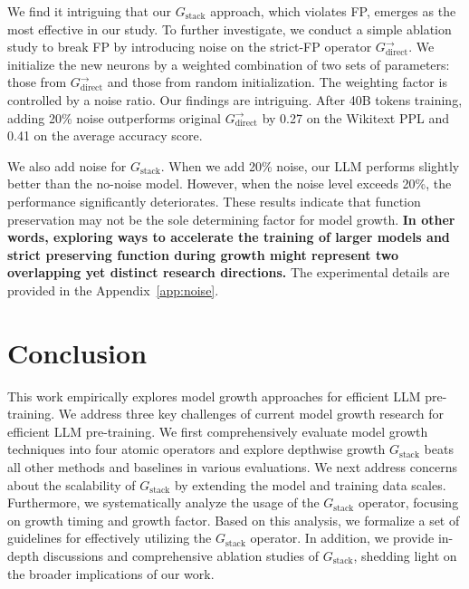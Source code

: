 \documentclass{article}
\begin{document}
We find it intriguing that our $G_{\text{stack}}$ approach, which violates FP, emerges as the most effective in our study.
To further investigate, we conduct a simple ablation study to break FP by introducing noise on the strict-FP operator $G_{\text{direct}}^{\to}$.
We initialize the new neurons by a weighted combination of two sets of parameters: those from $G_{\text{direct}}^{\to}$ and those from 
random initialization. The weighting factor is controlled by a noise ratio.
Our findings are intriguing. After 40B tokens training, adding 20\% noise outperforms original $G_{\text{direct}}^{\to}$ by 0.27 on the Wikitext PPL and 0.41 on the average accuracy score.

We also add noise for $G_{\text{stack}}$.
When we add 20\% noise, our LLM performs slightly better than the no-noise model.
However, when the noise level exceeds 20\%, the performance significantly deteriorates.
These results indicate that function preservation may not be the sole determining factor for model growth.
\textbf{In other words, exploring ways to accelerate the training of larger models and strict preserving function during growth might represent two overlapping yet distinct research directions.}
The experimental details are provided in the Appendix~\ref{app:noise}.


\section{Conclusion}\label{sec:conclusion}
This work empirically explores model growth approaches for efficient LLM pre-training. We address three key challenges of current model growth research for efficient LLM pre-training. 
We first comprehensively evaluate model growth techniques into four atomic operators and explore depthwise growth $G_{\text{stack}}$ beats all other methods and baselines in various evaluations. We next address concerns about the scalability of $G_{\text{stack}}$ by extending the model and training data scales. 
Furthermore, we systematically analyze the usage of the $G_{\text{stack}}$ operator, focusing on growth timing and growth factor.
Based on this analysis, we formalize a set of guidelines for effectively utilizing the $G_{\text{stack}}$ operator.
In addition, we provide in-depth discussions and comprehensive ablation studies of $G_{\text{stack}}$, shedding light on the broader implications of our work.
\end{document}

